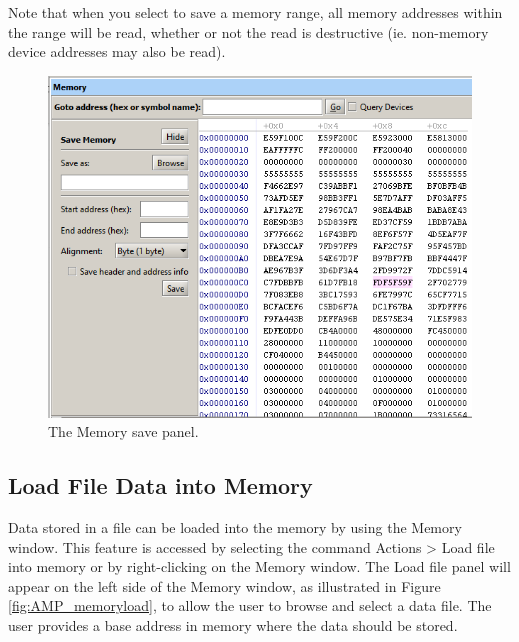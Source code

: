 \documentclass[11pt, twoside, pdftex]{article}
\begin{document}
Note that when you select to save a memory range, all memory addresses within
the range will be read, whether or not the read is destructive (ie. non-memory 
device addresses may also be read).

\begin{figure}[H]
	\begin{center}
		\includegraphics[scale=0.7]{screenshots/memory_save_window.png}
	\end{center}
	\caption{The Memory save panel.} 
	\label{fig:AMP_memorysave}
\end{figure}

\subsection{Load File Data into Memory}

Data stored in a file can be loaded into the memory by using the
Memory window. This feature is accessed by selecting the command
{\sf Actions > Load file into memory} or by right-clicking on the
Memory window. The {\sf Load file} panel will appear on the left
side of the Memory window, as illustrated in Figure \ref{fig:AMP_memoryload}, to allow
the user to browse and select a data file.  The user provides a base address in memory where the data should be stored. 
\end{document}
